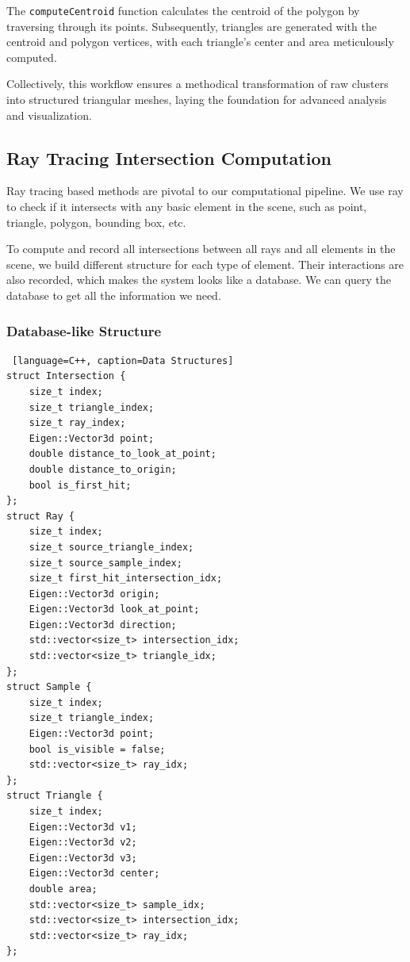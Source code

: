 \documentclass[11pt, a4paper,oneside,chapterprefix=false]{scrbook}
\begin{document}
The \texttt{computeCentroid} function calculates the centroid of the polygon by traversing through its points. Subsequently, triangles are generated with the centroid and polygon vertices, with each triangle's center and area meticulously computed.

Collectively, this workflow ensures a methodical transformation of raw clusters into structured triangular meshes, laying the foundation for advanced analysis and visualization.


\subsection{Ray Tracing Intersection Computation} \label{sec:ray tracing}

Ray tracing based methods are pivotal to our computational pipeline. We use ray to check if it intersects with any basic element in the scene, such as point, triangle, polygon, bounding box, etc.

To compute and record all intersections between all rays and all elements in the scene, we build different structure for each type of element. Their interactions are also recorded, which makes the system looks like a database. We can query the database to get all the information we need.  

\subsubsection{Database-like Structure}

\begin{lstlisting} [language=C++, caption=Data Structures]
struct Intersection {
    size_t index;
    size_t triangle_index;
    size_t ray_index;
    Eigen::Vector3d point;
    double distance_to_look_at_point;
    double distance_to_origin;
    bool is_first_hit;
};
struct Ray { 
    size_t index;
    size_t source_triangle_index;
    size_t source_sample_index;
    size_t first_hit_intersection_idx;
    Eigen::Vector3d origin;
    Eigen::Vector3d look_at_point;
    Eigen::Vector3d direction;
    std::vector<size_t> intersection_idx;
    std::vector<size_t> triangle_idx;
};
struct Sample {
    size_t index;
    size_t triangle_index;
    Eigen::Vector3d point;
    bool is_visible = false;
    std::vector<size_t> ray_idx;
};
struct Triangle {
    size_t index;
    Eigen::Vector3d v1;
    Eigen::Vector3d v2;
    Eigen::Vector3d v3;
    Eigen::Vector3d center;
    double area;
    std::vector<size_t> sample_idx;
    std::vector<size_t> intersection_idx;
    std::vector<size_t> ray_idx;
};

\end{lstlisting}
\end{document}
